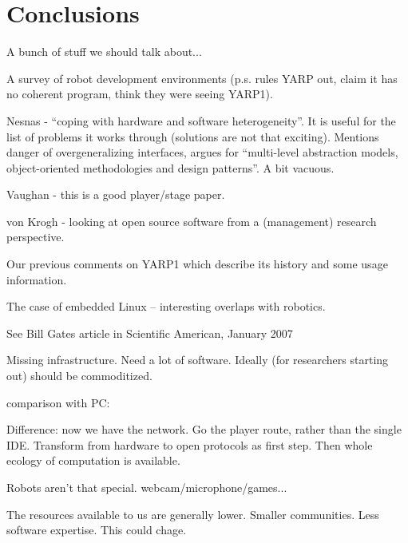
\section{Conclusions}

A bunch of stuff we should talk about...

A survey of robot development environments
\cite{kramer2007development} (p.s. rules YARP out, claim it has
no coherent program, think they were seeing YARP1).



Nesnas \cite{nesnas2006claraty} - ``coping with hardware and software 
heterogeneity''.  It is useful for the list of problems it
works through (solutions are not that exciting).
%
Mentions danger of overgeneralizing interfaces, argues for 
``multi-level abstraction models, object-oriented methodologies
and design patterns''.  A bit vacuous.

Vaughan \cite{vaughan2006reusable} - this is a good player/stage
paper.

von Krogh \cite{vonkrogh2006promise} - looking at open source
software from a (management) research perspective.

Our previous comments on YARP1 \cite{metta2006yarp} which
describe its history and some usage information.

The case of embedded Linux \cite{henkel2006selective} --
interesting overlaps with robotics.

See Bill Gates article in Scientific American, January 2007

Missing infrastructure.
Need a lot of software.
Ideally (for researchers starting out) should be commoditized.


comparison with PC:

Difference: now we have the network.  Go the player route, rather than
the single IDE.  Transform from hardware to open protocols as first
step.  Then whole ecology of computation is available.

Robots aren't that special.  webcam/microphone/games...

The resources available to us are generally lower.  Smaller communities.
Less software expertise.  This could chage.






